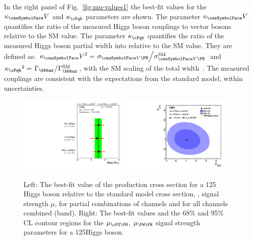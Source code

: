 \documentclass[11pt,twoside,a4paper,cmspaper,final,collab]{cms-tdr}
\begin{document}
In the right panel of Fig.~\ref{fig:mu-values1} the best-fit values
for the $\kappa_\Vvar$ and $\kappa_\cPqb$ parameters are shown. The parameter $\kappa_\Vvar$
quantifies the ratio of the measured Higgs boson couplings to vector
bosons relative to the SM value. The parameter $\kappa_\cPqb$ quantifies
the ratio of the measured Higgs
boson partial width into \bbbar relative to the SM value.
They are defined as:  ${\kappa_\Vvar}^2 =
\left.\sigma_{\VH}\middle/\sigma^{\mathrm{SM}}_{\VH}\right. $
and $ {\kappa_\cPqb}^2 = \left.\Gamma_{\bbbar}\middle/\Gamma^{\mathrm{SM}}_{\bbbar}\right. $,
with the SM scaling of the total
width~\cite{Heinemeyer:2013tqa}. The measured
couplings are consistent with the expectations from the standard
model, within uncertainties.





\begin{figure}[htbp]
  \begin{center}
\includegraphics[width=0.48\textwidth]{PRD_compatibility_Jul23}
\includegraphics[width=0.48\textwidth]{PRD_WH_ZH_2d_Sept11}
\caption{Left: The best-fit value of the production cross section for a 125\GeV
Higgs boson relative to the standard model cross section, \ie, signal
strength $\mu$, for partial
combinations of channels and for all channels combined (band). Right:
The best-fit values and the 68\% and 95\% CL
contour regions for the $\mu_{\ZH}$, $\mu_{\WH}$ signal strength parameters for a 125\GeV Higgs boson.}
    \label{fig:mu-values}
  \end{center}
\end{figure}
\end{document}
